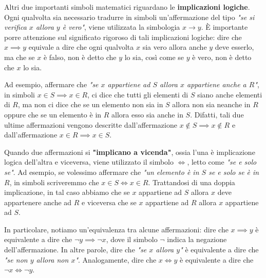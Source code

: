 \documentclass[a4paper, 12pt]{report}
\begin{document}
    Altri due importanti simboli matematici riguardano le \textbf{implicazioni logiche}. Ogni qualvolta sia necessario tradurre in simboli un'affermazione del tipo \textit{"se si verifica $x$ allora $y$ è vero"}, viene utilizzata la simbologia $x \to y$. È importante porre attenzione sul significato rigoroso di tali implicazioni logiche: dire che $x \implies y$ equivale a dire che ogni qualvolta $x$ sia vero allora anche $y$ deve esserlo, ma che se $x$ è falso, non è detto che $y$ lo sia, così come se $y$ è vero, non è detto che $x$ lo sia. 

    Ad esempio, affermare che \textit{"se $x$ appartiene ad $S$ allora $x$ appartiene anche a $R$"}, in simboli $x \in S \implies x \in R$, ci dice che tutti gli elementi di $S$ siano anche elementi di $R$, ma non ci dice che se un elemento non sia in $S$ allora non sia neanche in $R$ oppure che se un elemento è in $R$ allora esso sia anche in $S$. Difatti, tali due ultime affermazioni vengono descritte dall'affermazione $x \notin S \implies x \notin R$ e dall'affermazione $x \in R \implies x \in S$.

    Quando due affermazioni si \textbf{"implicano a vicenda"}, ossia l'una è implicazione logica dell'altra e viceversa, viene utilizzato il simbolo $\iff$, letto come \textit{"se e solo se"}. Ad esempio, se volessimo affermare che \textit{"un elemento è in $S$ se e solo se è in $R$}, in simboli scriveremmo che $x \in S \iff x \in R$. Trattandosi di una doppia implicazione, in tal caso abbiamo che se $x$ appartiene ad $S$ allora $x$ deve appartenere anche ad $R$ e viceversa che se $x$ appartiene ad $R$ allora $x$ appartiene ad $S$.

    In particolare, notiamo un'equivalenza tra alcune affermazioni: dire che $x \implies y$ è equivalente a dire che $\lnot y \implies \lnot x$, dove il simbolo $\lnot$ indica la negazione dell'affermazione. In altre parole, dire che \textit{"se $x$ allora $y$"} è equivalente a dire che \textit{"se non $y$ allora non $x$"}. Analogamente, dire che $x \iff y$ è equivalente a dire che $\lnot x \iff \lnot y$.

    \newpage
\end{document}
